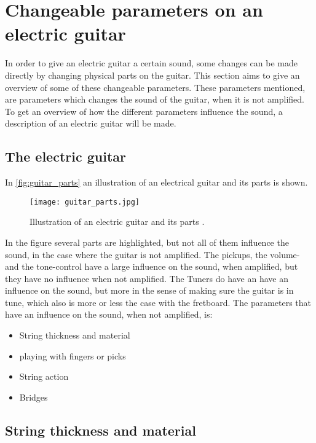 \section{Changeable parameters on an electric guitar}

In order to give an electric guitar a certain sound, some changes can be made directly by changing physical parts on the guitar. This section aims to give an overview of some of these changeable parameters. These parameters mentioned, are parameters which changes the sound of the guitar, when it is not amplified.
To get an overview of how the different parameters influence the sound, a description of an electric guitar will be made.

\subsection{The electric guitar}

In \autoref{fig:guitar_parts} an illustration of an electrical guitar and its parts is shown.

\begin{figure}[h]
	\centering
		\texttt{[image: guitar\_parts.jpg]}
		\caption{Illustration of an electric guitar and its parts \cite{coustii}.}
		\label{fig:guitar_parts}
\end{figure}

In the figure several parts are highlighted, but not all of them influence the sound, in the case where the guitar is not amplified. The pickups, the volume- and the tone-control have a large influence on the sound, when amplified, but they have no influence when not amplified. The Tuners do have an have an influence on the sound, but more in the sense of making sure the guitar is in tune, which also is more or less the case with the fretboard. 
The parameters that have an influence on the sound, when not amplified, is:

\begin{itemize}
 \item String thickness and material
 \item playing with fingers or picks
 \item String action
 \item Bridges
\end{itemize}

\subsection{String thickness and material}





